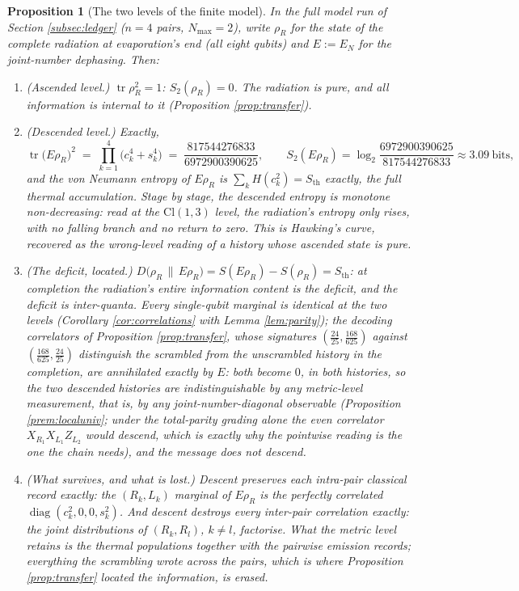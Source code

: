 \documentclass[11pt]{article}
\newtheorem{proposition}[theorem]{Proposition}
\theoremstyle{definition}
\newcommand{\Cl}{\mathrm{Cl}}
\newcommand{\Sth}{S_{\mathrm{th}}}
\newcommand{\tr}{\operatorname{tr}}
\newcommand{\EN}{E_{N}}
\newcommand{\rel}[2]{D\bigl(#1 \,\|\, #2\bigr)}
\begin{document}
\begin{proposition}[The two levels of the finite model]\label{prop:twoledgers}
In the full model run of Section \ref{subsec:ledger} ($n = 4$ pairs, $N_{\max} = 2$), write $\rho_R$ for the state of the complete radiation at evaporation's end (all eight qubits) and $E := \EN$ for the joint-number dephasing. Then:
\begin{enumerate}
\item (Ascended level.) $\tr \rho_R^2 = 1$: $S_2(\rho_R) = 0$. The radiation is pure, and all information is internal to it (Proposition \ref{prop:transfer}).
\item (Descended level.) Exactly,
\[
\tr\bigl(E\rho_R\bigr)^2 \;=\; \prod_{k=1}^{4}\bigl(c_k^4 + s_k^4\bigr) \;=\; \frac{817544276833}{6972900390625},
\qquad
S_2(E\rho_R) = \log_2\frac{6972900390625}{817544276833} \approx 3.09 \ \text{bits},
\]
and the von Neumann entropy of $E\rho_R$ is $\sum_k H(c_k^2) = \Sth$ exactly, the full thermal accumulation. Stage by stage, the descended entropy is monotone non-decreasing: read at the $\Cl(1,3)$ level, the radiation's entropy only rises, with no falling branch and no return to zero. This is Hawking's curve, recovered as the wrong-level reading of a history whose ascended state is pure.
\item (The deficit, located.) $\rel{\rho_R}{E\rho_R} = S(E\rho_R) - S(\rho_R) = \Sth$: at completion the radiation's entire information content is the deficit, and the deficit is inter-quanta. Every single-qubit marginal is identical at the two levels (Corollary \ref{cor:correlations} with Lemma \ref{lem:parity}); the decoding correlators of Proposition \ref{prop:transfer}, whose signatures $(\tfrac{24}{25}, \tfrac{168}{625})$ against $(\tfrac{168}{625}, \tfrac{24}{25})$ distinguish the scrambled from the unscrambled history in the completion, are annihilated exactly by $E$: both become $0$, in both histories, so the two descended histories are indistinguishable by any metric-level measurement, that is, by any joint-number-diagonal observable (Proposition \ref{prem:localuniv}; under the total-parity grading alone the even correlator $X_{R_1}X_{L_1}Z_{L_2}$ would descend, which is exactly why the pointwise reading is the one the chain needs), and the message does not descend.
\item (What survives, and what is lost.) Descent preserves each intra-pair classical record exactly: the $(R_k, L_k)$ marginal of $E\rho_R$ is the perfectly correlated $\operatorname{diag}(c_k^2, 0, 0, s_k^2)$. And descent destroys every inter-pair correlation exactly: the joint distributions of $(R_k, R_l)$, $k \neq l$, factorise. What the metric level retains is the thermal populations together with the pairwise emission records; everything the scrambling wrote \emph{across} the pairs, which is where Proposition \ref{prop:transfer} located the information, is erased.
\end{enumerate}
\end{proposition}
\end{document}
